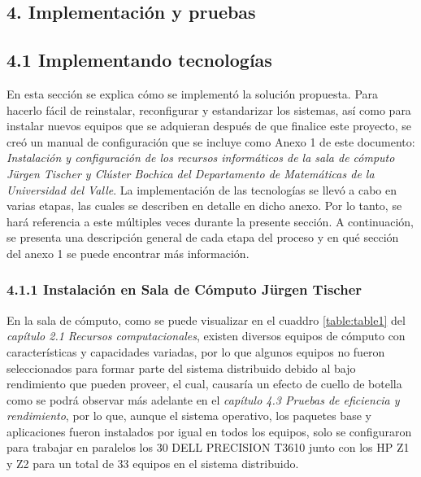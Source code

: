\begin{spacing}{1.5}
  \begin{tightcenter}
    \section{4. Implementación y pruebas}
    \mylinespacing
  \end{tightcenter}

  \subsection{4.1 Implementando tecnologías}

  En esta sección se explica cómo se implementó la solución propuesta. Para hacerlo fácil de reinstalar, reconfigurar y estandarizar los sistemas, así como para instalar nuevos equipos que se adquieran después de que finalice este proyecto, se creó un manual de configuración que se incluye como Anexo 1 de este documento: \textit{Instalación y configuración de los recursos informáticos de la sala de cómputo Jürgen Tischer y Clúster Bochica del Departamento de Matemáticas de la Universidad del Valle}. La implementación de las tecnologías se llevó a cabo en varias etapas, las cuales se describen en detalle en dicho anexo. Por lo tanto, se hará referencia a este múltiples veces durante la presente sección. A continuación, se presenta una descripción general de cada etapa del proceso y en qué sección del anexo 1 se puede encontrar más información.

  \subsubsection{4.1.1 Instalación en Sala de Cómputo Jürgen Tischer}

  En la sala de cómputo, como se puede visualizar en el cuaddro \ref{table:table1} del \textit{capítulo 2.1 Recursos computacionales}, existen diversos equipos de cómputo con características y capacidades variadas, por lo que algunos equipos no fueron seleccionados para formar parte del sistema distribuido debido al bajo rendimiento que pueden proveer, el cual, causaría un efecto de cuello de botella como se podrá observar más adelante en el \textit{capítulo 4.3 Pruebas de eficiencia y rendimiento}, por lo que, aunque el sistema operativo, los paquetes base y aplicaciones fueron instalados por igual en todos los equipos, solo se configuraron para trabajar en paralelos los 30 DELL PRECISION T3610 junto con los HP Z1 y Z2 para un total de 33 equipos en el sistema distribuido.


\end{spacing}
